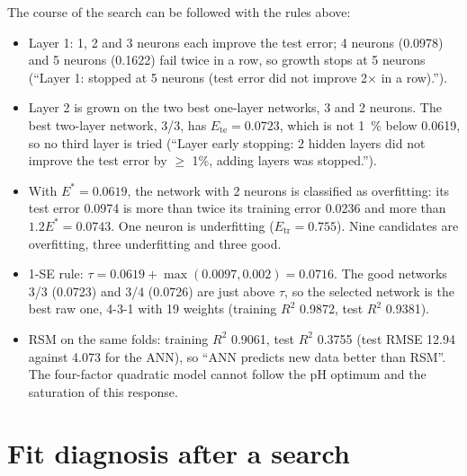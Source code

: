 The course of the search can be followed with the rules above:
\begin{itemize}
  \item Layer 1: 1, 2 and 3 neurons each improve the test error; 4 neurons (0.0978) and 5 neurons (0.1622) fail
    twice in a row, so growth stops at 5 neurons (``Layer 1: stopped at 5 neurons (test error did not improve 2×
    in a row).'').
  \item Layer 2 is grown on the two best one-layer networks, 3 and 2 neurons. The best two-layer network, 3/3,
    has $E_\text{te} = 0.0723$, which is not 1~\% below 0.0619, so no third layer is tried (``Layer early stopping:
    2 hidden layers did not improve the test error by $\ge$ 1\%, adding layers was stopped.'').
  \item With $E^* = 0.0619$, the network with 2 neurons is classified as overfitting: its test error 0.0974 is
    more than twice its training error 0.0236 and more than $1.2E^* = 0.0743$. One neuron is underfitting
    ($E_\text{tr} = 0.755$). Nine candidates are overfitting, three underfitting and three good.
  \item 1-SE rule: $\tau = 0.0619 + \max(0.0097, 0.002) = 0.0716$. The good networks 3/3 (0.0723) and 3/4 (0.0726)
    are just above $\tau$, so the selected network is the best raw one, 4-3-1 with 19 weights (training $R^2$
    0.9872, test $R^2$ 0.9381).
  \item RSM on the same folds: training $R^2$ 0.9061, test $R^2$ 0.3755 (test RMSE 12.94 against 4.073 for the
    ANN), so ``ANN predicts new data better than RSM''. The four-factor quadratic model cannot follow the pH
    optimum and the saturation of this response.
\end{itemize}

\section{Fit diagnosis after a search}\label{sec:ch07-diagnosis}

